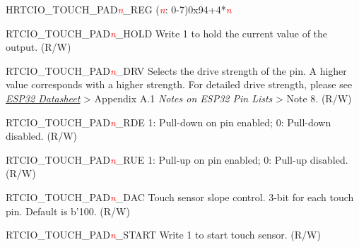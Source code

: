 \begin{register}{H}{RTCIO\_TOUCH\_PAD\textcolor{red}{\it{n}}\_REG (\textcolor{red}{\it{n}}: 0-7)}{0x94+4*\textcolor{red}{\it{n}}}\label{regdesc:RTCIOTOUCHPADnREG} 
%
%
%
%
%
%
%
%
%
%
%
%
%
%
%
%
\regnewline%
\begin{regdesc}\begin{reglist}
\item[RTCIO\_TOUCH\_PAD\textcolor{red}{\it{n}}\_HOLD] Write 1 to hold the current value of the output. (R/W)
\item[RTCIO\_TOUCH\_PAD\textcolor{red}{\it{n}}\_DRV] Selects the drive strength of the pin. A higher value corresponds with a higher strength.
For detailed drive strength, please see \href{https://www.espressif.com/sites/default/files/documentation/esp32_datasheet_en.pdf}{\textit{ESP32 Datasheet}} > Appendix A.1 \textit{Notes on ESP32 Pin Lists} > Note 8. (R/W)\\
\item[RTCIO\_TOUCH\_PAD\textcolor{red}{\it{n}}\_RDE] 1: Pull-down on pin enabled; 
0: Pull-down disabled.
(R/W)
\item[RTCIO\_TOUCH\_PAD\textcolor{red}{\it{n}}\_RUE] 1: Pull-up on pin enabled;
0: Pull-up disabled.
(R/W)
\item [RTCIO\_TOUCH\_PAD\textcolor{red}{\it{n}}\_DAC]Touch sensor slope control. 3-bit for each touch pin. Default is b'100.  (R/W) 
\item [RTCIO\_TOUCH\_PAD\textcolor{red}{\it{n}}\_START] Write 1 to start touch sensor. (R/W)

\end{reglist}
\end{regdesc}
\end{register}
